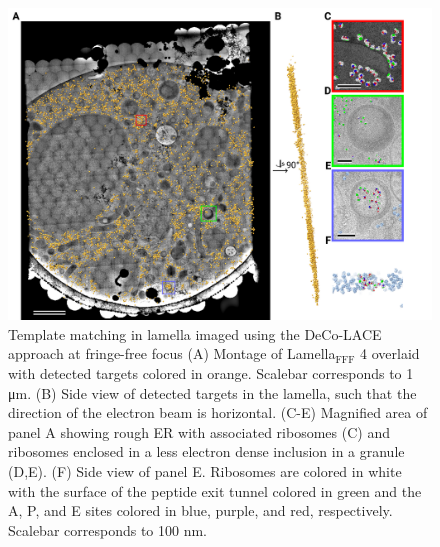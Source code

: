 \documentclass[
]{article}
\begin{document}
\begin{figure}
\hypertarget{fig:matching_fff}{%
\centering
\includegraphics{figures/matching_fff.png}
\caption{Template matching in lamella imaged using the DeCo-LACE approach at fringe-free
focus (A) Montage of Lamella\(_\textrm{FFF}\) 4 overlaid with detected targets colored in orange. Scalebar corresponds to 1 μm. (B) Side view of detected targets in the lamella, such that the
direction of the electron beam is horizontal. (C-E) Magnified area of panel A
showing rough ER with associated ribosomes (C) and ribosomes
enclosed in a less electron dense inclusion in a granule (D,E). (F) Side view of
panel E. Ribosomes are colored in white with the surface of the peptide exit tunnel colored in green and the A, P, and E sites colored in blue, purple, and red, respectively. Scalebar corresponds to 100 nm.}\label{fig:matching_fff}
}
\end{figure}
\end{document}

